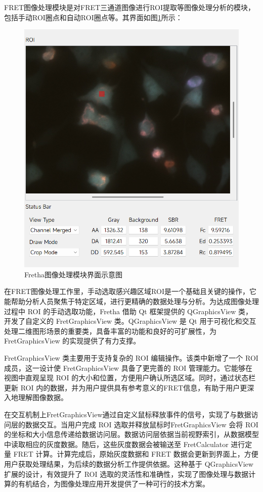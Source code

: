 FRET图像处理模块是对FRET三通道图像进行ROI提取等图像处理分析的模块，包括手动ROI圈点和自动ROI圈点等。其界面如图\ref{fig:fretha_imageprocess_ui}所示：

\begin{figure}[htbp]
    \centering
    \includegraphics[width=0.75\linewidth]{../figures/2/2_图像处理模块界面.png}
    \caption{Fretha图像处理模块界面示意图}
    \label{fig:fretha_imageprocess_ui}
\end{figure}

在FRET图像处理工作里，手动选取感兴趣区域ROI是一个基础且关键的操作，它能帮助分析人员聚焦于特定区域，进行更精确的数据处理与分析。为达成图像处理过程中 ROI 的手动选取功能，Fretha 借助 Qt 框架提供的 QGraphicsView 类，开发了自定义的 FretGraphicsView 类。QGraphicsView 是 Qt 用于可视化和交互处理二维图形场景的重要类，具备丰富的功能和良好的可扩展性，为 FretGraphicsView 的实现提供了有力支撑。

FretGraphicsView 类主要用于支持复杂的 ROI 编辑操作。该类中新增了一个 ROI 成员，这一设计使 FretGraphicsView 具备了更完善的 ROI 管理能力。它能够在视图中直观呈现 ROI 的大小和位置，方便用户确认所选区域。同时，通过状态栏更新 ROI 内的数据，并为用户提供具有参考意义的FRET信息，有助于用户更深入地理解图像数据。

在交互机制上FretGraphicsView通过自定义鼠标释放事件的信号，实现了与数据访问层的数据交互。当用户完成 ROI 选取并释放鼠标时FretGraphicsView 会将 ROI 的坐标和大小信息传递给数据访问层。数据访问层依据当前视野索引，从数据模型中读取相应的灰度数据。随后，这些灰度数据会被输送至 FretCalculator 进行定量 FRET 计算。计算完成后，原始灰度数据和 FRET 数据会更新到界面上，方便用户获取处理结果，为后续的数据分析工作提供依据。这种基于 QGraphicsView 扩展的设计，有效提升了 ROI 选取的灵活性和准确性，实现了图像处理与数据计算的有机结合，为图像处理应用开发提供了一种可行的技术方案。 

